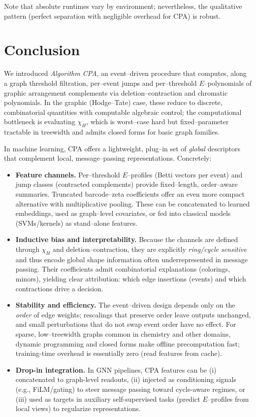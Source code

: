 \documentclass[runningheads]{llncs}
\begin{document}
Note that absolute runtimes vary by environment; nevertheless, 
the qualitative pattern (perfect separation with negligible overhead for CPA) is robust.






\section{Conclusion}
\label{sec:conclusion}

We introduced \emph{Algorithm CPA}, an event–driven procedure that computes, 
along a graph threshold filtration, per–event jumps and per–threshold 
$E$–polynomials of graphic arrangement complements via deletion–contraction and chromatic polynomials. In the graphic (Hodge–Tate) case, these reduce to discrete, combinatorial quantities with computable algebraic control; the computational bottleneck is evaluating $\chi_H$, which is worst–case hard but fixed–parameter tractable in treewidth and admits closed forms for basic graph families.

In machine learning, CPA offers a lightweight, plug–in set of \emph{global} descriptors that complement local, message–passing representations. Concretely:
\begin{itemize}
  \item \textbf{Feature channels.} Per–threshold $E$–profiles (Betti vectors per event) and 
jump classes (contracted complements) provide fixed–length, order–aware summaries. 
Truncated barcode–zeta coefficients offer an even more compact alternative with multiplicative pooling. 
These can be concatenated to learned embeddings, used as graph–level covariates, or fed into classical models (SVMs/kernels) as stand–alone features.
  \item \textbf{Inductive bias and interpretability.} Because the channels are defined through $\chi_H$ and deletion–contraction, they are explicitly \emph{ring/cycle sensitive} and thus encode global shape information often underrepresented in message passing. Their coefficients admit combinatorial explanations (colorings, minors), yielding clear attribution: which edge insertions (events) and which contractions drive a decision.
  \item \textbf{Stability and efficiency.} The event–driven design depends only on the \emph{order} of edge weights; rescalings that preserve order leave outputs unchanged, and small perturbations that do not swap event order have no effect. For sparse, low–treewidth graphs common in chemistry and other domains, dynamic programming and closed forms make offline precomputation fast; training-time overhead is essentially zero (read features from cache).
  \item \textbf{Drop-in integration.} In GNN pipelines, CPA features can be (i) concatenated to graph-level readouts, (ii) injected as conditioning signals (e.g., FiLM/gating) to steer message passing toward cycle-aware regimes, or (iii) used as targets in auxiliary self-supervised tasks (predict $E$–profiles from local views) to regularize representations.
\end{itemize}
\end{document}
